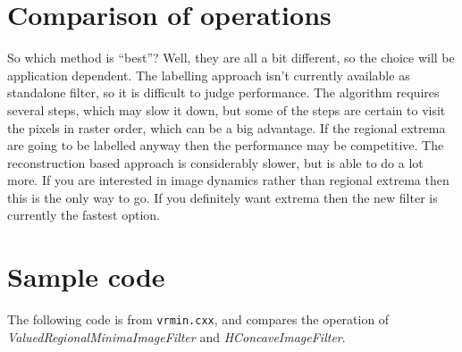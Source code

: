 \documentclass{InsightArticle}
\begin{document}
\section{Comparison of operations}
So which method is ``best''? Well, they are all a bit different, so
the choice will be application dependent. The labelling approach
isn't currently available as standalone filter, so it is difficult to
judge performance. The algorithm requires several steps, which may
slow it down, but some of the steps are certain to visit the pixels in
raster order, which can be a big advantage. If the regional extrema
are going to be labelled anyway then the performance may be
competitive. The reconstruction based approach is considerably slower,
but is able to do a lot more. If you are interested in image dynamics
rather than regional extrema then this is the only way to go. If you
definitely want extrema then the new filter is currently the fastest
option.

\section{Sample code}
The following code is from {\tt vrmin.cxx}, and compares the operation
of {\em ValuedRegionalMinimaImageFilter} and {\em HConcaveImageFilter}.
\end{document}

